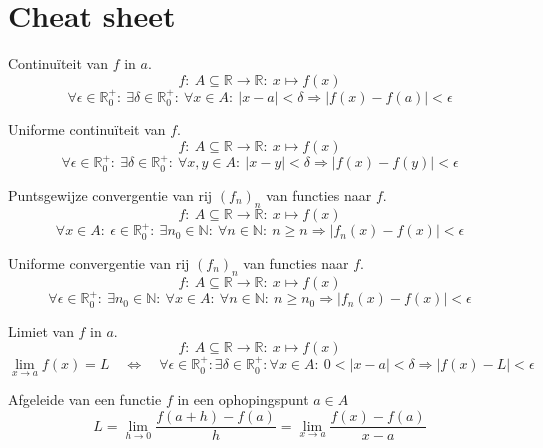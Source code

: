 \documentclass[main.tex]{subfiles}
\begin{document}
\chapter{Cheat sheet}
\label{cha:cheat-sheet}



\begin{de}
  Continu\"iteit van $f$ in $a$.
  \[ f:\ A \subseteq \mathbb{R} \rightarrow \mathbb{R}:\ x \mapsto f(x) \]
  \[ \forall \epsilon \in \mathbb{R}_{0}^{+}:\ \exists \delta \in \mathbb{R}_{0}^{+}:\ \forall x\in A:\ |x-a| < \delta \Rightarrow |f(x) -f(a)| < \epsilon \]
\end{de}

\begin{de}
  Uniforme continu\"iteit van $f$.
  \[ f:\ A \subseteq \mathbb{R} \rightarrow \mathbb{R}:\ x \mapsto f(x) \]
  \[ \forall \epsilon \in \mathbb{R}_{0}^{+}:\ \exists \delta \in \mathbb{R}_{0}^{+}:\ \forall x,y \in A:\ |x-y| < \delta \Rightarrow |f(x)-f(y)| < \epsilon \]
\end{de}

\begin{de}
  Puntsgewijze convergentie van rij $(f_{n})_{n}$ van functies naar $f$.
  \[ f:\ A \subseteq \mathbb{R} \rightarrow \mathbb{R}:\ x \mapsto f(x) \]
  \[ \forall x\in A:\ \epsilon \in \mathbb{R}_{0}^{+}:\ \exists n_{0}\in \mathbb{N}:\ \forall n\in \mathbb{N}:\ n \ge n \Rightarrow |f_{n}(x)-f(x)| < \epsilon \]
\end{de}

\begin{de}
  Uniforme convergentie van rij $(f_{n})_{n}$ van functies naar $f$.
  \[ f:\ A \subseteq \mathbb{R} \rightarrow \mathbb{R}:\ x \mapsto f(x) \]
  \[ \forall \epsilon \in \mathbb{R}_{0}^{+}:\ \exists n_{0} \in \mathbb{N}:\ \forall x \in A:\ \forall n\in \mathbb{N}:\ n \ge n_{0} \Rightarrow |f_{n}(x)-f(x)| < \epsilon \]
\end{de}

\begin{de}
  Limiet van $f$ in $a$.
  \[ f:\ A \subseteq \mathbb{R} \rightarrow \mathbb{R}:\ x \mapsto f(x) \]
    \[
    \lim_{x\rightarrow a}f(x) = L \quad\Leftrightarrow\quad
    \forall \epsilon \in \mathbb{R}_{0}^{+}: \exists \delta \in \mathbb{R}_{0}^{+}: \forall x\in A:\ 0 < |x-a| < \delta \Rightarrow |f(x) - L| < \epsilon
    \]
\end{de}

\begin{de}
  Afgeleide van een functie $f$ in een ophopingspunt $a \in A$
  \[ L = \lim_{h\rightarrow 0}\frac{f(a+h)-f(a)}{h} = \lim_{x \rightarrow a}\frac{f(x)-f(a)}{x-a} \]
\end{de}
\end{document}
